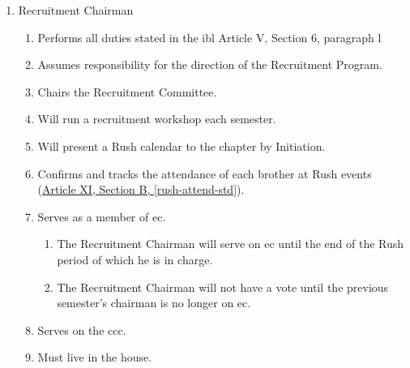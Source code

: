 \begin{enumerate}
        \item Recruitment Chairman
			\begin{enumerate}
				\item Performs all duties stated in the \gls{ibl} Article V, Section 6, paragraph l
				\item Assumes responsibility for the direction of the Recruitment Program.
				\item Chairs the Recruitment Committee.
				\item Will run a recruitment workshop each semester.
				\item Will present a Rush calendar to the chapter by Initiation.
				\item Confirms and tracks the attendance of each brother at Rush events (\hyperref[rush-attend-std]{Article XI, Section B, \autoref*{rush-attend-std}}). 
				\item Serves as a member of \gls{ec}. \label{recruit-chair-term}
					\begin{enumerate}
						\item The Recruitment Chairman will serve on \gls{ec} until the end of the Rush period of which he is in charge.
						\item The Recruitment Chairman will not have a vote until the previous semester's chairman is no longer on \gls{ec}.
					\end{enumerate}
                \item Serves on the \gls{ccc}.
                \item Must live in the house.
			\end{enumerate}


\end{enumerate}
